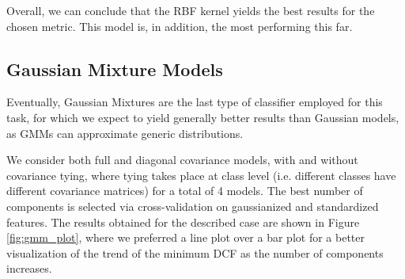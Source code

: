 \noindent
\begin{table}[H]
	\caption{min DCF for Support Vector Classifier models, with and without feature balancing.}
	\label{tab:best_svc_res}
\end{table}

Overall, we can conclude that the RBF kernel yields the best results for the chosen metric. This model is, in addition, the most performing this far. 

\subsection{Gaussian Mixture Models}
Eventually, Gaussian Mixtures are the last type of classifier employed for this task, for which we expect to yield generally better results than Gaussian models, as GMMs can approximate generic distributions.

We consider both full and diagonal covariance models, with and without covariance tying, where tying takes place at class level (i.e. different classes have different covariance matrices) for a total of 4 models. The best number of components is selected via cross-validation on gaussianized and standardized features. The results obtained for the described case are shown in Figure \ref{fig:gmm_plot}, where we preferred a line plot over a bar plot for a better visualization of the trend of the minimum DCF as the number of components increases.

